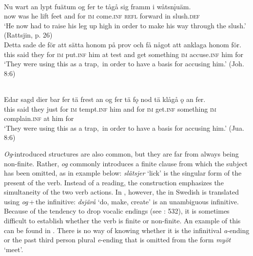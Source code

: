 \documentclass[output=paper]{langscibook}
\begin{document}
\ex {}\\\label{ex:kalm:15b}
\gll Nu wart an lypt fuätum og fer te tågå sig framm i wåtsn\k{i}uäm.\\
now was he lift feet and for \textsc{im} come.\textsc{inf} \textsc{refl} forward in slush.\textsc{def}\\
\glt ‘He now had to raise his leg up high in order to make his way through the slush.’ (Rattsjin, p. 26)
\z 
\ex
\label{ex:kalm:16}
\ea {}\\\label{ex:kalm:16a}
\gll Detta sade de för att sätta honom på prov och få något att anklaga honom för.\\
this said they for \textsc{im} put.\textsc{inf} him at test and get something \textsc{im} accuse.\textsc{inf} him for\\
\glt ‘They were using this  as a trap,{~}in order to have a basis for accusing him.’ (Joh. 8:6)

\ex {}\\\label{ex:kalm:16b}
\gll Edar sagd dier bar fer tä frest an og fer tä fǫ nod tä klågå ǫ an fer.\\
this said they just for \textsc{im} tempt.\textsc{inf} him and for \textsc{im} get.\textsc{inf} something \textsc{im} complain.\textsc{inf} at him for\\
\glt ‘They were using this  as a trap,{~}in order to have a basis for accusing him.’ (Jua. 8:6)
\z 
\z 

\textit{Og}-introduced structures are also common, but they are far from always being non-finite. Rather, \textit{og} commonly introduces a finite clause from which the subject has been omitted, as in example  below: \textit{slätsjer} ‘lick’ is the singular form of the present  of the verb. Instead of a  reading, the construction emphasizes the simultaneity of the two verb actions. In , however, the  in Swedish is translated using \textit{og}\,+\,the infinitive: \textit{dsjärå} ‘do, make, create’ is an unambiguous infinitive. Because of the  tendency to drop vocalic endings (see \citealt{AkerbergNystrom2012}: 532), it is sometimes difficult to establish whether the verb is finite or non-finite. An example of this can be found in . There is no way of knowing whether it is the infinitival \textit{a}{}-ending or the past  third person plural \textit{e}{}-ending that is omitted from the form \textit{myöt} ‘meet’. 
\end{document}

